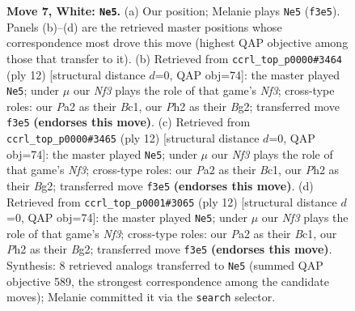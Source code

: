 \documentclass[11pt]{article}
\begin{document}
\begin{figure}[p]
\caption{\textbf{Move 7, White: \texttt{Ne5}.} (a) Our position; Melanie plays \texttt{Ne5} (\texttt{f3e5}). Panels (b)--(d) are the retrieved master positions whose correspondence most drove this move (highest QAP objective among those that transfer to it). (b) Retrieved from \texttt{ccrl\_top\_p0000\#3464} (ply 12) [structural distance $d$=0, QAP obj=74]: the master played \texttt{Ne5}; under $\mu$ our \emph{Nf3} plays the role of that game's \emph{Nf3}; cross-type roles: our \emph{P}a2 as their \emph{B}c1, our \emph{P}h2 as their \emph{B}g2; transferred move \texttt{f3e5} \textbf{(endorses this move)}. (c) Retrieved from \texttt{ccrl\_top\_p0000\#3465} (ply 12) [structural distance $d$=0, QAP obj=74]: the master played \texttt{Ne5}; under $\mu$ our \emph{Nf3} plays the role of that game's \emph{Nf3}; cross-type roles: our \emph{P}a2 as their \emph{B}c1, our \emph{P}h2 as their \emph{B}g2; transferred move \texttt{f3e5} \textbf{(endorses this move)}. (d) Retrieved from \texttt{ccrl\_top\_p0001\#3065} (ply 12) [structural distance $d$=0, QAP obj=74]: the master played \texttt{Ne5}; under $\mu$ our \emph{Nf3} plays the role of that game's \emph{Nf3}; cross-type roles: our \emph{P}a2 as their \emph{B}c1, our \emph{P}h2 as their \emph{B}g2; transferred move \texttt{f3e5} \textbf{(endorses this move)}. Synthesis: 8 retrieved analogs transferred to \texttt{Ne5} (summed QAP objective 589, the strongest correspondence among the candidate moves); Melanie committed it via the \texttt{search} selector.}
\label{fig:thought-m12}
\end{figure}

\clearpage
\end{document}
